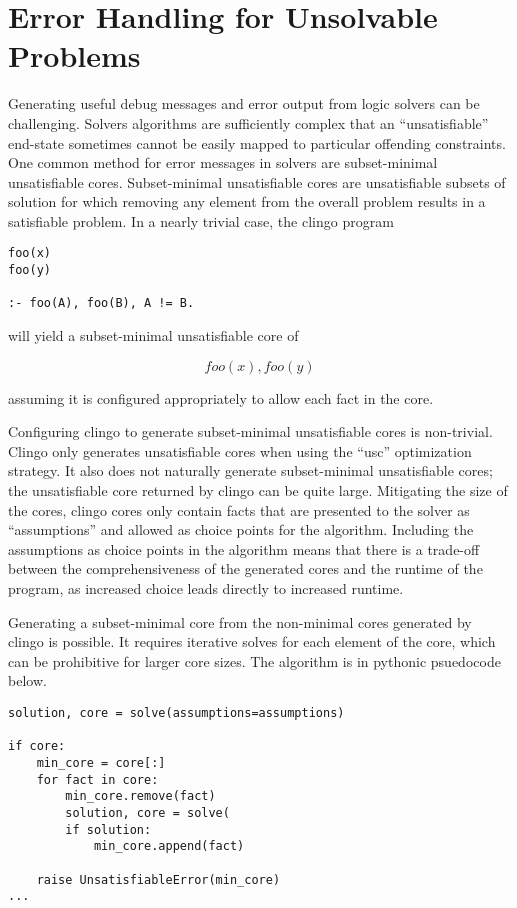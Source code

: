 \section{Error Handling for Unsolvable Problems}
\label{sec:error-handling}

Generating useful debug messages and error output from logic solvers can be challenging.
Solvers algorithms are sufficiently complex that an ``unsatisfiable'' end-state sometimes cannot be easily mapped to particular offending constraints.
One common method for error messages in solvers are subset-minimal unsatisfiable cores.
Subset-minimal unsatisfiable cores are unsatisfiable subsets of solution for which removing any element from the overall problem results in a satisfiable problem.
In a nearly trivial case, the clingo program

\begin{verbatim}
foo(x)
foo(y)

:- foo(A), foo(B), A != B.
\end{verbatim}

will yield a subset-minimal unsatisfiable core of

$$ {foo(x), foo(y)} $$

assuming it is configured appropriately to allow each fact in the core.

Configuring clingo to generate subset-minimal unsatisfiable cores is non-trivial.
Clingo only generates unsatisfiable cores when using the ``usc'' optimization strategy.
It also does not naturally generate subset-minimal unsatisfiable cores; the unsatisfiable core returned by clingo can be quite large.
Mitigating the size of the cores, clingo cores only contain facts that are presented to the solver as ``assumptions'' and allowed as choice points for the algorithm.
Including the assumptions as choice points in the algorithm means that there is a trade-off between the comprehensiveness of the generated cores and the runtime of the program, as increased choice leads directly to increased runtime.

Generating a subset-minimal core from the non-minimal cores generated by clingo is possible.
It requires iterative solves for each element of the core, which can be prohibitive for larger core sizes.
The algorithm is in pythonic psuedocode below.

\begin{verbatim}
solution, core = solve(assumptions=assumptions)

if core:
    min_core = core[:]
    for fact in core:
        min_core.remove(fact)
        solution, core = solve(
        if solution:
            min_core.append(fact)

    raise UnsatisfiableError(min_core)
...
\end{verbatim}

